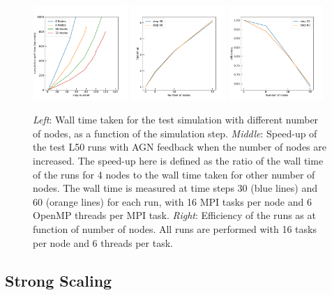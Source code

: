 \documentclass[letterpaper,11pt]{article}
\begin{document}
\begin{figure}[htbp]
\centering
\includegraphics[width=0.32\textwidth]{cum_time_6.pdf}
\includegraphics[width=0.32\textwidth]{strong_scaling_6.pdf}
\includegraphics[width=0.32\textwidth]{strong_scaling_efficiency_6.pdf}

\caption{{\em Left}: Wall time taken for the test simulation with different number of nodes, as a function of the simulation step. {\em Middle}: Speed-up of the test L50 runs with AGN feedback when the number of nodes are increased. The speed-up here is defined as the ratio of the wall time of the runs for 4 nodes to the wall time taken for other number of nodes. The wall time is measured at time steps 30 (blue lines) and 60 (orange lines) for each run, with 16 MPI tasks per node and 6 OpenMP threads per MPI task. {\em Right}: Efficiency of the runs as at function of number of nodes. 
All runs are performed with 16 tasks per node and 6 threads per task. 
}  
\label{fig:strong_scaling}
\end{figure}

\subsection{Strong Scaling}
\end{document}
